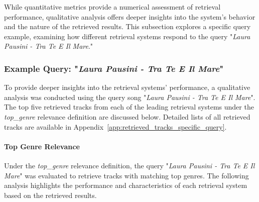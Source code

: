 \documentclass[sigconf]{acmart}
\begin{document}
While quantitative metrics provide a numerical assessment of retrieval performance, qualitative analysis offers deeper insights into the system’s behavior and the nature of the retrieved results. This subsection explores a specific query example, examining how different retrieval systems respond to the query "\textit{Laura Pausini - Tra Te E Il Mare}."

\subsubsection{Example Query: "\textit{Laura Pausini - Tra Te E Il Mare}"}
\label{subsubsec:example_query}

To provide deeper insights into the retrieval systems' performance, a qualitative analysis was conducted using the query song "\textit{Laura Pausini - Tra Te E Il Mare}". The top five retrieved tracks from each of the leading retrieval systems under the \textit{top\_genre} relevance definition are discussed below. Detailed lists of all retrieved tracks are available in Appendix~\ref{app:retrieved_tracks_specific_query}.

\paragraph{Top Genre Relevance}

Under the \textit{top\_genre} relevance definition, the query "\textit{Laura Pausini - Tra Te E Il Mare}" was evaluated to retrieve tracks with matching top genres. The following analysis highlights the performance and characteristics of each retrieval system based on the retrieved results.
\end{document}
